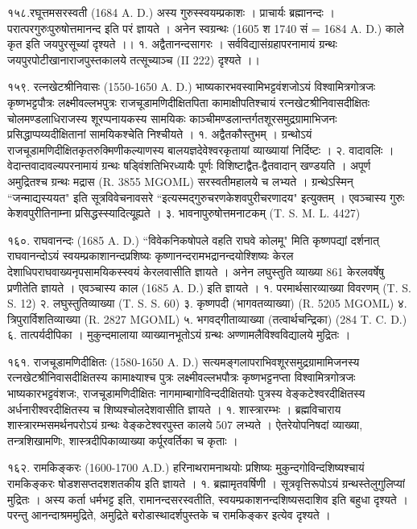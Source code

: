 १५८.रघूत्तमसरस्वती (1684 A. D.)
अस्य गुरुस्स्वयम्प्रकाशः । प्राचार्यः ब्रह्मानन्दः । परात्परगुरुःपुरुषोत्तमानन्द इति परं ज्ञायते । अनेन स्वग्रन्थः (1605 श 1740 सं = 1684 A. D.) काले कृत इति जयपुरसूच्यां दृश्यते ।।
१. अद्वैतानन्दसागरः । सर्वविद्यासंग्रहापरनामायं ग्रन्थः जयपुरपोटीखानाराजपुस्तकालये तत्सूच्याञ्च (II 222) दृश्यते ।।

१५९. रत्नखेटश्रीनिवासः (1550-1650 A. D.)
भाष्यकारभवस्वामिभट्टवंशजोऽयं विश्वामित्रगोत्रजः कृष्णभट्टपौत्रः लक्ष्मीवल्लभपुत्रः राजचूडामणिदीक्षितपिता कामाक्षीपतिश्चायं रत्नखेटश्रीनिवासदीक्षितः चोलमण्डलाधिराजस्य शूरप्पनायकस्य सामयिकः काञ्चीमण्डलान्तर्गतशूरसमुद्रग्रामाभिजनः प्रसिद्धाप्पय्यदीक्षितानां सामयिकश्चेति निश्चीयते ।
१. अद्वैतकौस्तुभम् । ग्रन्थोऽयं राजचूडामणिदीक्षितकृतरुक्मिणीकल्याणस्य बालयज्ञदेवेश्वरकृतायां व्याख्यायां निर्दिष्टः ।
२. वादावलिः । वेदान्तवादावल्यपरनामायं ग्रन्थः षड्विंशतिभिरध्यायैः पूर्णः विशिष्टाद्वैत-द्वैतवादान् खण्डयति । अपूर्ण अमुद्रितश्च ग्रन्थः मद्रास (R. 3855 MGOML) सरस्वतीमहालये च लभ्यते । ग्रन्थेऽस्मिन् ``जन्माद्यस्ययत" इति सूत्रविवेचनावसरे ``इत्यस्मद्गुरुचरणकेशवपुरीचरणादय" इत्युक्तम् । एवञ्चास्य गुरुः केशवपुरीतिनाम्ना प्रसिद्धस्स्यादित्यू्ह्यते ।
३. भावनापुरुषोत्तमनाटकम् (T. S. M. L. 4427)

१६०. राघवानन्दः (1685 A. D.)
``विवेकनिकषोपले वहति राघवे कोलमू" मिति कृष्णपद्यां दर्शनात् राघवानन्दोऽयं स्वयम्प्रकाशानन्दप्रशिष्यः कृष्णानन्दरामभद्रानन्दयोश्शिष्यः केरल देशाधिपराघवाख्यनृपसामयिकस्स्वयं केरलवासीति ज्ञायते । अनेन लघुस्तुति व्याख्या 861 केरलवर्षेषु प्रणीतेति ज्ञायते । एवञ्चास्य काल (1685 A. D.) इति ज्ञायते ।
१. परमार्थसारव्याख्या विवरणम् (T. S. S. 12)
२. लघुस्तुतिव्याख्या (T. S. S. 60)
३. कृष्णपदी (भागवतव्याख्या) (R. 5205 MGOML)
४. त्रिपुरार्विशतिव्याख्या (R. 2827 MGOML)
५. भगवद्गीताव्याख्या (तत्वार्थचन्द्रिका) (284 T. C. D.)
६. तात्पर्यदीपिका । मुकुन्दमालाया व्याख्यानभूतोऽयं ग्रन्थः अण्णामलैविश्वविद्यालये मुद्रितः ।

१६१. राजचूडामणिदीक्षितः (1580-1650 A. D.)
सत्यमङ्गलापराभिवशूरसमुद्रग्रामामिजनस्य रत्नखेटश्रीनिवासदीक्षितस्य कामाक्ष्याश्च पुत्रः लक्ष्मीवल्लभपौत्रः कृष्णभट्टनप्ता विश्वामित्रगोत्रजः भाष्यकारभट्टवंशजः, राजचूडामणिदीक्षितः नागमाम्बागोविन्ददीक्षितयोः पुत्रस्य वेङ्कटेश्वरदीक्षितस्य अर्धनारीश्वरदीक्षितस्य च शिष्यश्चोलदेशवासीति ज्ञायते ।
१. शास्त्रारम्भः । ब्रह्मविचाराय शास्त्रारम्भसमर्थनपरोऽयं ग्रन्थः वेङ्कटेश्वरपुस्त कालये 507 लभ्यते ।
ऐतरेयोपनिषदां व्याख्या, तन्त्रशिखामणिः, शास्त्रदीपिकाव्याख्या कर्पूरवर्तिका च कृताः ।

१६२. रामकिङ्करः (1600-1700 A.D.)
हरिनाथरामनाथयोः प्रशिष्यः मुकुन्दगोविन्दशिष्यश्चायं रामकिङ्करः षोडशसप्तदशशतकीय इति ज्ञायते ।
१. ब्रह्मामृतवर्षिणी । सूत्रवृत्तिरूपोऽयं ग्रन्थस्तेलुगुलिप्यां मुद्रितः । अस्य कर्ता धर्मभट्ट इति, रामानन्दसरस्वतीति, स्वयम्प्रकाशनन्दशिष्यसदाशिव इति बहुधा दृश्यते । परन्तु आनन्दाश्रममुद्रिते, अमुद्रिते बरोडास्थादर्शपुस्तके च रामकिङ्कर इत्येव दृश्यते ।

